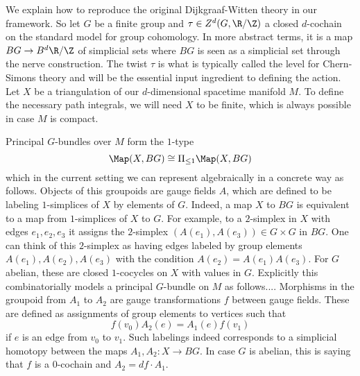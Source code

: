\begin{example}
\end{example}

\begin{example}
We explain how to reproduce the original Dijkgraaf-Witten theory in our framework.
So let $G$ be a finite group and $\tau \in Z^d(G, \R/ \Z)$ a closed $d$-cochain on the standard model for group cohomology.
In more abstract terms, it is a map $BG \to B^{d} \R/\Z$ of simplicial sets where $BG$ is seen as a simplicial set through the nerve construction.
The twist $\tau$ is what is typically called the level for Chern-Simons theory and will be the essential input ingredient to defining the action.
Let $X$ be a triangulation of our $d$-dimensional spacetime manifold $M$.
To define the necessary path integrals, we will need $X$ to be finite, which is always possible in case $M$ is compact.

Principal $G$-bundles over $M$ form the $1$-type
\[
\Map(X, BG) \cong \Pi_{\leq 1} \Map(X, BG)
\]
which in the current setting we can represent algebraically in a concrete way as follows.
Objects of this groupoids are gauge fields $A$, which are defined to be labeling $1$-simplices of $X$ by elements of $G$.
Indeed, a map $X$ to $BG$ is equivalent to a map from $1$-simplices of $X$ to $G$.
For example, to a $2$-simplex in $X$ with edges $e_1, e_2, e_3$ it assigns the $2$-simplex $(A(e_1), A(e_3)) \in G \times G$ in $BG$.
One can think of this $2$-simplex as having edges labeled by group elements $A(e_1), A(e_2), A(e_3)$ with the condition $A(e_2) = A(e_1) A(e_3)$.
For $G$ abelian, these are closed $1$-cocycles on $X$ with values in $G$.
Explicitly this combinatorially models a principal $G$-bundle on $M$ as follows....
Morphisms in the groupoid from $A_1$ to $A_2$ are gauge transformations $f$ between gauge fields.
These are defined as assignments of group elements to vertices such that
\[
f(v_0) A_2(e) = A_1(e) f(v_1)
\]
if $e$ is an edge from $v_0$ to $v_1$.
Such labelings indeed corresponds to a simplicial homotopy between the maps $A_1, A_2: X \to BG$.
In case $G$ is abelian, this is saying that $f$ is a $0$-cochain and $A_2 = df \cdot A_1$.


\end{example}
